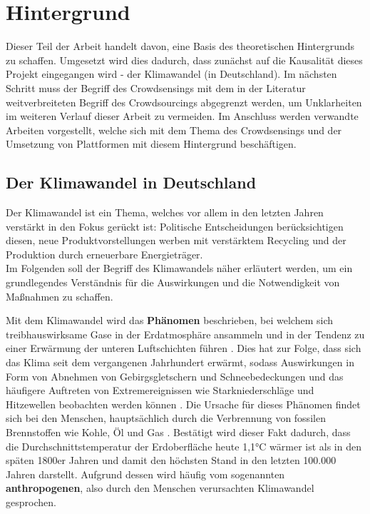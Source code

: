 \chapter{Hintergrund} %
Dieser Teil der Arbeit handelt davon, eine Basis des theoretischen Hintergrunds zu schaffen. Umgesetzt wird dies dadurch, dass zunächst auf die Kausalität dieses Projekt eingegangen wird - der Klimawandel (in Deutschland). Im nächsten Schritt muss der Begriff des Crowdsensings mit dem in der Literatur weitverbreiteten Begriff des Crowdsourcings abgegrenzt werden, um Unklarheiten im weiteren Verlauf dieser Arbeit zu vermeiden. Im Anschluss werden verwandte Arbeiten vorgestellt, welche sich mit dem Thema des Crowdsensings und der Umsetzung von Plattformen mit diesem Hintergrund beschäftigen.

\section{Der Klimawandel in Deutschland}
Der Klimawandel ist ein Thema, welches vor allem in den letzten Jahren verstärkt in den Fokus gerückt ist: Politische Entscheidungen berücksichtigen diesen, neue Produktvorstellungen werben mit verstärktem Recycling und der Produktion durch erneuerbare Energieträger. \\ Im Folgenden soll der Begriff des Klimawandels näher erläutert werden, um ein grundlegendes Verständnis für die Auswirkungen und die Notwendigkeit von Maßnahmen zu schaffen.

Mit dem Klimawandel wird das \textbf{Phänomen} beschrieben, bei welchem sich treibhauswirksame Gase in der Erdatmosphäre ansammeln und in der Tendenz zu einer Erwärmung der unteren Luftschichten führen \cite{UmweltbundesamtKlimawandel}. Dies hat zur Folge, dass sich das Klima seit dem vergangenen Jahrhundert erwärmt, sodass Auswirkungen in Form von Abnehmen von Gebirgsgletschern und Schneebedeckungen und das häufigere Auftreten von Extremereignissen wie Starkniederschläge und Hitzewellen beobachten werden können \cite{UmweltbundesamtKlimawandel}. Die Ursache für dieses Phänomen findet sich bei den Menschen, hauptsächlich durch die Verbrennung von fossilen Brennstoffen wie Kohle, Öl und Gas \cite{UnitedNationsClimateChange}. Bestätigt wird dieser Fakt dadurch, dass die Durchschnittstemperatur der Erdoberfläche heute 1,1°C wärmer ist als in den späten 1800er Jahren und damit den höchsten Stand in den letzten 100.000 Jahren \cite{UnitedNationsClimateChange} darstellt. Aufgrund dessen wird häufig vom sogenannten \textbf{anthropogenen}, also durch den Menschen verursachten Klimawandel gesprochen.

